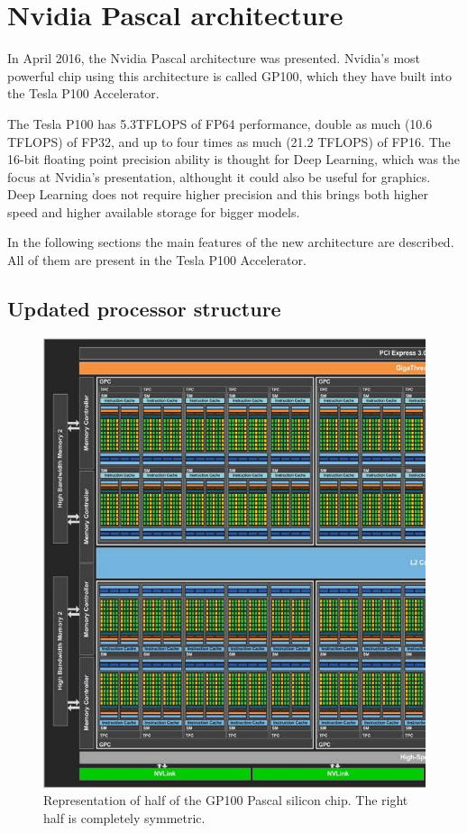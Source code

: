 
\section{Nvidia Pascal architecture \cite{nvidia:pascalwhitepaper}}
In April 2016, the Nvidia Pascal architecture was presented.
Nvidia's most powerful chip using this architecture is called GP100, which they have built into the Tesla P100 Accelerator.

The Tesla P100 has 5.3TFLOPS of FP64 performance, double as much (10.6 TFLOPS) of FP32, and up to four times as much (21.2 TFLOPS) of FP16.
The 16-bit floating point precision ability is thought for Deep Learning, which was the focus at Nvidia's presentation, althought it could also be useful for graphics.
Deep Learning does not require higher precision and this brings both higher speed and higher available storage for bigger models.

In the following sections the main features of the new architecture are described.
All of them are present in the Tesla P100 Accelerator.

\subsection{Updated processor structure}
\begin{figure}[ht!]
    \centering
    \includegraphics[width=\linewidth]{gp100_half}
    \caption{Representation of half of the GP100 Pascal silicon chip. The right half is
             completely symmetric. \cite{nvidia:pascalwhitepaper}}
    \label{fig:gp100}
\end{figure}

